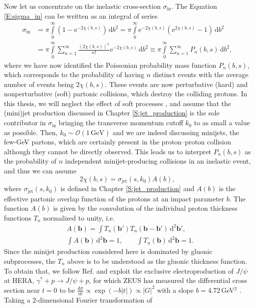\documentclass[a4paper, twoside, english, 12pt]{report}
\begin{document}
Now let us concentrate on the inelastic cross-section $\sigma_\text{in}$. The Equation \eqref{E:sigma_in} can be written as an integral of series
\begin{align}\label{E:sigma_in_as_series}
	\sigma_\text{in} &= \pi\int\limits_0^\infty \left(1-\text{e}^{-2\chi(b,s)} \right) \, \text{d}b^2 = \pi\int\limits_0^\infty \text{e}^{-2\chi(b,s)}\left(\text{e}^{2\chi(b,s)} -1 \right) \, \text{d}b^2 \nonumber\\
	&= \pi\int\limits_0^\infty \sum\limits_{n=1}^\infty \frac{(2\chi(b,s))^n}{n!} \text{e}^{-2\chi(b,s)} \, \text{d}b^2 \equiv \pi\int\limits_0^\infty \sum\limits_{n=1}^\infty P_n(b,s)\, \text{d}b^2 ,
\end{align}
where we have now identified the Poissonian probability mass function $P_n(b,s)$, which corresponds to the probability of having $n$ distinct events with the average number of events being $2\chi(b,s)$. These events are now perturbative (hard) and nonperturbative (soft) partonic collisions, which destroy the colliding protons. In this thesis, we will neglect the effect of soft processes \cite{xnw}, and assume that the (mini)jet production discussed in Chapter \ref{S:jet_production} is the sole contributor in $\sigma_\text{in}$ bringing the transverse momentum cutoff $k_0$ to as small a value as possible. Then, $k_0 \sim \mathcal{O}(1\,\text{GeV})$ and we are indeed discussing minijets, the few-GeV partons, which are certainly present in the proton--proton collision although they cannot be directly observed. This leads us to interpret $P_n(b,s)$ as the probability of $n$ independent minijet-producing collisions in an inelastic event, and thus we can assume 
\begin{equation}\label{E:eikonal_function_in_model}
	2\chi(b,s) = \sigma_\text{jet}(s,k_0)A(b),
\end{equation}
where $\sigma_\text{jet}(s,k_0)$ is defined in Chapter \ref{S:jet_production} and $A(b)$ is the effective partonic overlap function of the protons at an impact parameter $b$. The function $A(b)$ is given by the convolution of the individual proton	 thickness functions $T_n$ normalized to unity, i.e.
\begin{align}
	&A(\mathbf{b}) =\int T_n(\mathbf{b'})T_n(\mathbf{b}-\mathbf{b'}) \,\text{d}^2\mathbf{b'} , \label{E:convolution}\\[0.1em]
	&\int A(\mathbf{b}) \,\text{d}^2\mathbf{b} = 1, \qquad  \int T_n(\mathbf{b}) \,\text{d}^2\mathbf{b} = 1.
\end{align} 
Since the minijet production considered here is dominated by gluonic subprocesses, the $T_n$ above is to be understood as the gluonic thickness function. To obtain that, we follow Ref. \cite{kjenuc} and exploit the exclusive electroproduction of $J/\psi$ at HERA, $\gamma^* + p \rightarrow J/\psi + p$, for which ZEUS has measured the differential cross section near $t = 0$ to be $\frac{\text{d}\sigma}{\text{d}t} \propto \exp(-b|t|)\propto |G|^2$  with a slope $b = 4.72\,$GeV$^2$ \cite{zeuksen_pap}. Taking a 2-dimensional Fourier transformation of
\end{document}
